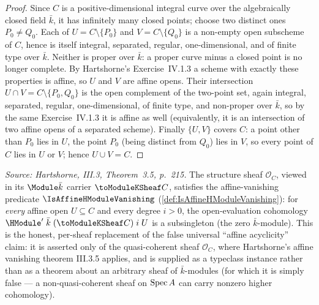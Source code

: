 \begin{proof}
  Since \(C\) is a positive-dimensional integral curve over the
  algebraically closed field \(\bar k\), it has infinitely many closed
  points; choose two distinct ones \(P_0 \ne Q_0\). Each of
  \(U = C \setminus \{P_0\}\) and \(V = C \setminus \{Q_0\}\) is a
  non-empty open subscheme of \(C\), hence is itself integral,
  separated, regular, one-dimensional, and of finite type over
  \(\bar k\). Neither is proper over \(\bar k\): a proper curve minus a
  closed point is no longer complete. By Hartshorne's Exercise~IV.1.3 a
  scheme with exactly these properties is affine, so \(U\) and \(V\) are
  affine opens. Their intersection \(U \cap V = C \setminus \{P_0, Q_0\}\)
  is the open complement of the two-point set, again integral, separated,
  regular, one-dimensional, of finite type, and non-proper over
  \(\bar k\), so by the same Exercise~IV.1.3 it is affine as well
  (equivalently, it is an intersection of two affine opens of a separated
  scheme). Finally \(\{U, V\}\) covers \(C\): a point other than
  \(P_0\) lies in \(U\), the point \(P_0\) (being distinct from
  \(Q_0\)) lies in \(V\), so every point of \(C\) lies in \(U\) or
  \(V\); hence \(U \cup V = C\).
\end{proof}

\begin{lemma}
  \label{lem:isAffineHModuleVanishing_toModuleKSheaf}
  \textit{Source: Hartshorne, III.3, Theorem~3.5, p.~215.}
  The structure sheaf \(\mathcal O_C\), viewed in its \(\Module \bar k\)
  carrier \(\toModuleKSheaf C\), satisfies the affine-vanishing predicate
  \(\IsAffineHModuleVanishing\) (\cref{def:IsAffineHModuleVanishing}): for
  \emph{every} affine open \(U \subseteq C\) and every degree \(i > 0\),
  the open-evaluation cohomology
  \(\HModule'\;\bar k\;(\toModuleKSheaf C)\;i\;U\) is a subsingleton
  (the zero \(\bar k\)-module). This is the honest, per-sheaf replacement
  of the false universal ``affine acyclicity'' claim: it is asserted only
  of the quasi-coherent sheaf \(\mathcal O_C\), where Hartshorne's affine
  vanishing theorem III.3.5 applies, and is supplied as a typeclass
  instance rather than as a theorem about an arbitrary sheaf of
  \(\bar k\)-modules (for which it is simply false --- a non-quasi-coherent
  sheaf on \(\operatorname{Spec} A\) can carry nonzero higher cohomology).
\end{lemma}


